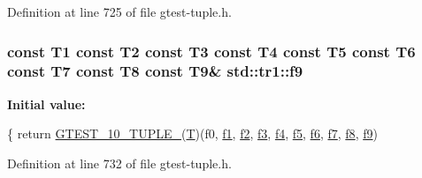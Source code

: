 Definition at line 725 of file gtest-\/tuple.\+h.

\subsubsection[{\texorpdfstring{f9}{f9}}]{\setlength{\rightskip}{0pt plus 5cm}const T1 const T2 const T3 const T4 const T5 const T6 const T7 const T8 const T9\& std\+::tr1\+::f9}\hypertarget{namespacestd_1_1tr1_a216d2c7cdfaaf415caba2f88e2c34413}{}\label{namespacestd_1_1tr1_a216d2c7cdfaaf415caba2f88e2c34413}
{\bfseries Initial value\+:}
\begin{DoxyCode}
\{
  \textcolor{keywordflow}{return} \hyperlink{gtest-tuple_8h_a275e7bcd84299cc44b9c1dba971951c4}{GTEST\_10\_TUPLE\_}(\hyperlink{all__17_8js_adf1f3edb9115acb0a1e04209b7a9937b}{T})(f0, \hyperlink{namespacestd_1_1tr1_a9c0fa65b105f8e2f58ba59ecf75fd000}{f1}, \hyperlink{namespacestd_1_1tr1_a87dd9e009868361317f587126dba63d4}{f2}, \hyperlink{namespacestd_1_1tr1_a0f7c3b47d27d42d82d1a333ea420ce4e}{f3}, \hyperlink{namespacestd_1_1tr1_adc796e02b7385d526aff708189564f67}{f4}, \hyperlink{namespacestd_1_1tr1_a9c1eb66b2b2fa321942af95405232a0d}{f5}, \hyperlink{namespacestd_1_1tr1_a6b62f32e1e3e21bceb94eb46c4cbfd56}{f6}, 
      \hyperlink{namespacestd_1_1tr1_a2185f3a1c07f2df072c39cb91ffa89a4}{f7}, \hyperlink{namespacestd_1_1tr1_ab998afa41cea8d6d26d7e4288b0bf974}{f8}, \hyperlink{namespacestd_1_1tr1_a216d2c7cdfaaf415caba2f88e2c34413}{f9})
\end{DoxyCode}


Definition at line 732 of file gtest-\/tuple.\+h.

